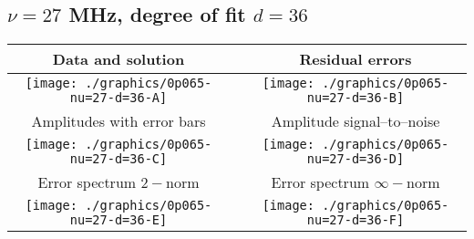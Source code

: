 

% 

\clearpage{}
\break{}

\subsection{$\nu = 27$ MHz, degree of fit $d = 36$}

\begin{table}[h]
    \begin{center}
        \begin{tabular}{ccc}
            Data and solution & \quad & Residual errors \\\hline
            \texttt{[image: ./graphics/0p065-nu=27-d=36-A]} &&
            \texttt{[image: ./graphics/0p065-nu=27-d=36-B]} \\[15pt]
            Amplitudes with error bars && Amplitude signal--to--noise \\\hline
            \texttt{[image: ./graphics/0p065-nu=27-d=36-C]} &&
            \texttt{[image: ./graphics/0p065-nu=27-d=36-D]} \\[15pt]
            Error spectrum $2-$norm && Error spectrum $\infty-$norm \\\hline
            \texttt{[image: ./graphics/0p065-nu=27-d=36-E]} &&
            \texttt{[image: ./graphics/0p065-nu=27-d=36-F]} \\[15pt]
        \end{tabular}
    \end{center}
\label{fig:elev=65, nu=27}
\end{table}



\endinput
